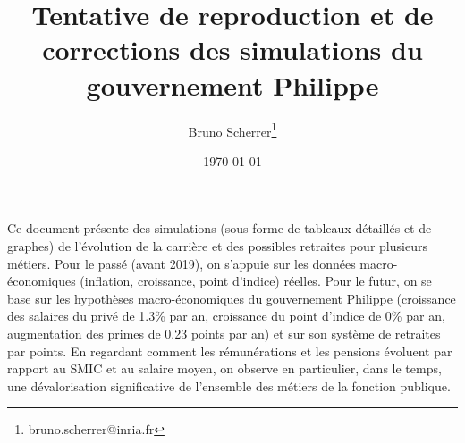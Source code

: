 \documentclass[a4paper,10pt]{report}
\title{Tentative de reproduction et de corrections des simulations du gouvernement Philippe}
\author{Bruno Scherrer\footnote{bruno.scherrer@inria.fr}}
\date{\today}
\begin{document}
\makeatletter
\renewcommand\tableofcontents{%
    \@starttoc{toc}%
}
\makeatother

\dominitoc


\maketitle

\doclicenseThis



Ce document présente des simulations (sous forme de tableaux détaillés et de graphes) de l'évolution de la carrière et des possibles retraites pour plusieurs métiers. Pour le passé (avant 2019), on s'appuie sur les données macro-économiques (inflation, croissance, point d'indice) réelles. Pour le futur, on se base sur les hypothèses macro-économiques du gouvernement Philippe (croissance des salaires du privé de 1.3\% par an, croissance du point d'indice de 0\% par an, augmentation des primes de 0.23 points par an) et sur son système de retraites par points.
En regardant comment les rémunérations et les pensions évoluent par rapport au SMIC et au salaire moyen, on observe en particulier, dans le temps, une dévalorisation significative de l'ensemble des métiers de la fonction publique.

\setcounter{tocdepth}{0}
\begingroup
\let\clearpage\relax
\tableofcontents
\endgroup



\end{document}
